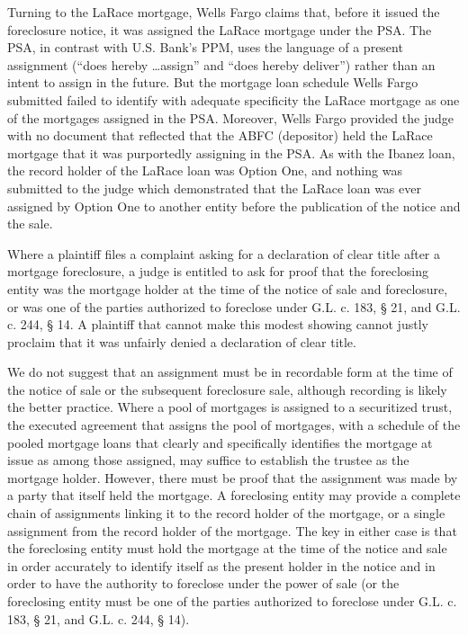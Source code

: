 Turning to the LaRace mortgage, Wells Fargo claims that, before it issued the
foreclosure notice, it was assigned the LaRace mortgage under the PSA. The PSA,
in contrast with U.S. Bank's PPM, uses the language of a present assignment
(``does hereby \dots assign'' and ``does hereby deliver'') rather than an
intent to assign in the future. But the mortgage loan schedule Wells Fargo
submitted failed to identify with adequate specificity the LaRace mortgage as
one of the mortgages assigned in the PSA. Moreover, Wells Fargo provided the
judge with no document that reflected that the ABFC (depositor) held the LaRace
mortgage that it was purportedly assigning in the PSA. As with the Ibanez loan,
the record holder of the LaRace loan was Option One, and nothing was submitted
to the judge which demonstrated that the LaRace loan was ever assigned by
Option One to another entity before the publication of the notice and the sale.

Where a plaintiff files a complaint asking for a declaration of clear title
after a mortgage foreclosure, a judge is entitled to ask for proof that the
foreclosing entity was the mortgage holder at the time of the notice of sale
and foreclosure, or was one of the parties authorized to foreclose under G.L.
c. 183, {\S} 21, and G.L. c. 244, {\S} 14. A plaintiff that cannot make this
modest showing cannot justly proclaim that it was unfairly denied a declaration
of clear title. 

We do not suggest that an assignment must be in recordable form at the time of
the notice of sale or the subsequent foreclosure sale, although recording is
likely the better practice. Where a pool of mortgages is assigned to a
securitized trust, the executed agreement that assigns the pool of mortgages,
with a schedule of the pooled mortgage loans that clearly and specifically
identifies the mortgage at issue as among those assigned, may suffice to
establish the trustee as the mortgage holder. However, there must be proof that
the assignment was made by a party that itself held the mortgage. A foreclosing
entity may provide a complete chain of assignments linking it to the record
holder of the mortgage, or a single assignment from the record holder of the
mortgage. The key in either case is that the foreclosing entity must hold the
mortgage at the time of the notice and sale in order accurately to identify
itself as the present holder in the notice and in order to have the authority
to foreclose under the power of sale (or the foreclosing entity must be one of
the parties authorized to foreclose under G.L. c. 183, {\S} 21, and G.L. c.
244, {\S} 14).

